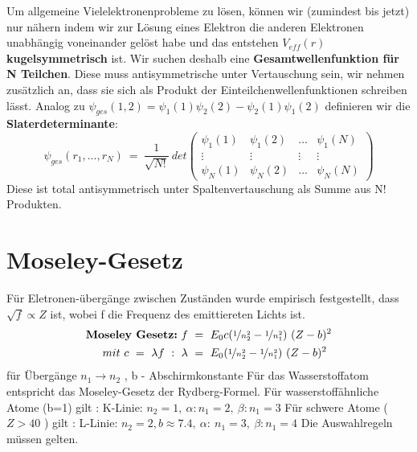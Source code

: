 \documentclass[Ex4_Zusammenfassung.tex]{subfiles}
\begin{document}
Um allgemeine Vielelektronenprobleme zu lösen, können wir (zumindest bis jetzt) nur nähern indem wir zur Lösung eines Elektron die anderen Elektronen unabhängig voneinander gelöst habe und das entstehen $ V_{eff}(r) $ \textbf{kugelsymmetrisch} ist. \newline
Wir suchen deshalb eine  \textbf{Gesamtwellenfunktion für N Teilchen}. \newline
Diese muss antisymmetrische unter Vertauschung sein, wir nehmen zusätzlich an, dass sie sich als Produkt der Einteilchenwellenfunktionen schreiben lässt. \newline 
Analog zu $ \psi_{ges}(1,2) = \psi_1(1) \psi_2(2) - \psi_2(1) \psi_1(2) $  definieren wir die \\ \textbf{Slaterdeterminante}: 
	\begin{equation}
	  \psi_{ges}(r_1,...,r_N) \ = \  \frac{1}{\sqrt{N!}} \  det \begin{pmatrix} \psi_1(1) & \psi_1(2) & \dots & \psi_1(N) \\ \vdots & \vdots & \vdots & \vdots \\  \psi_N(1) & \psi_N(2) & \dots & \psi_N(N)  \end{pmatrix} 
	\end{equation}
Diese ist total antisymmetrisch unter Spaltenvertauschung als Summe aus N! Produkten. 
\section{Moseley-Gesetz}
Für Eletronen-übergänge zwischen Zuständen wurde empirisch festgestellt, dass $ \sqrt{f} \propto Z $ ist, wobei f die Frequenz des emittiereten Lichts ist. 
\begin{align*}
\textbf{Moseley Gesetz:} \ f \ &= \ E_0 c (\nicefrac{1}{n_2^2} - \nicefrac{1}{n_1^2}) \ (Z-b)^2 \\ 
mit \  c \  = \    \lambda f \ :   \	\lambda \ & = \ E_0 (\nicefrac{1}{n_2^2} - \nicefrac{1}{n_1^2}) \ (Z-b)^2
\end{align*}
für Übergänge $ n_1 \rightarrow n_2 $ , b - Abschirmkonstante \newline
Für das Wasserstoffatom entspricht das Moseley-Gesetz der Rydberg-Formel. \newline
Für wasserstoffähnliche Atome (b=1) gilt : \quad K-Linie: $ n_2 = 1, \  \alpha :  n_1 = 2, \  \beta: n_1 = 3 $ \newline
Für schwere Atome ($ Z > 40 $  )  gilt :  \qquad L-Linie: $ n_2 = 2 , b \approx 7.4 , \ \alpha : \ n_1= 3 , \  \beta: n_1 = 4 $ \newline
Die Auswahlregeln müssen gelten. 
\end{document}
